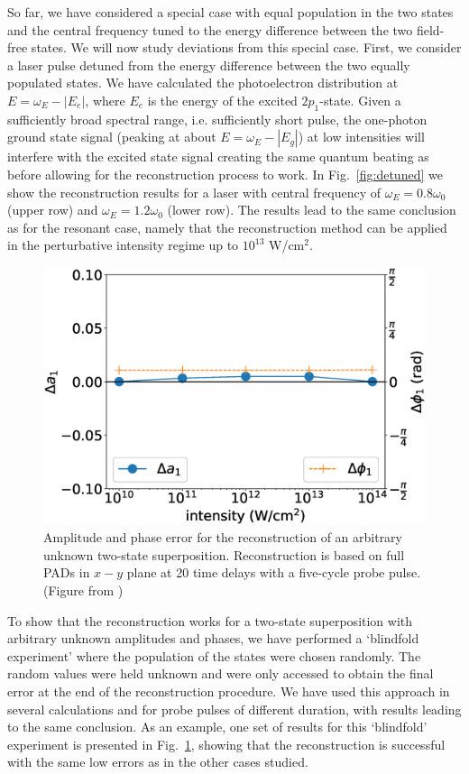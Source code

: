 So far, we have considered a special case with equal population in the two states and the central frequency tuned to the energy difference between the two field-free states. We will now study deviations from this special case. First, we consider a laser pulse detuned from the energy difference between the two equally populated states. We have calculated the photoelectron distribution at $E=\omega_E-|E_e|$, where $E_e$ is the energy of the excited $2p_1$-state. Given a sufficiently broad spectral range, i.e. sufficiently short pulse, the one-photon ground state signal (peaking at about $E = \omega_E-|E_g|$) at low intensities will interfere with the excited state signal creating the same quantum beating as before allowing for the reconstruction process to work. In Fig.~\ref{fig:detuned} we show the reconstruction results for a laser with central frequency of $\omega_E = 0.8\omega_0$ (upper row) and $\omega_E = 1.2\omega_0$ (lower row). 
The results lead to the same conclusion as for the resonant case, namely that the reconstruction method can be applied in the perturbative intensity regime up to $10^{13}$ W/cm$^2$.

\begin{figure}[!ht]
\centering
\includegraphics[width=0.5\linewidth]{figs/Photo_ionization/superpositions/Venzke_new_fig_7.eps}
\caption{
Amplitude and phase error for the reconstruction of an arbitrary unknown two-state superposition. Reconstruction is based on full PADs in $x-y$ plane at 20 time delays with a five-cycle probe pulse. (Figure from \cite{venzke2021_wave})
} 
  \label{fig:random_state}
\end{figure}

To show that the reconstruction works for a two-state superposition with arbitrary unknown amplitudes and phases, we have performed a `blindfold experiment' where the population of the states were chosen randomly. The random values were held unknown and were only accessed to obtain the final error at the end of the reconstruction procedure. We have used this approach in several calculations and for probe pulses of different duration, with results
leading to the same conclusion. As an example, one set of results for this `blindfold' experiment is presented in Fig.~\ref{fig:random_state}, showing that the reconstruction is successful with the same low errors as in the other cases studied.

